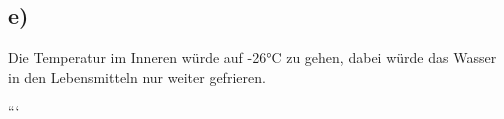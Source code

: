 

\subsection*{e)}
Die Temperatur im Inneren würde auf -26°C zu gehen, dabei würde das Wasser in den Lebensmitteln nur weiter gefrieren.

```